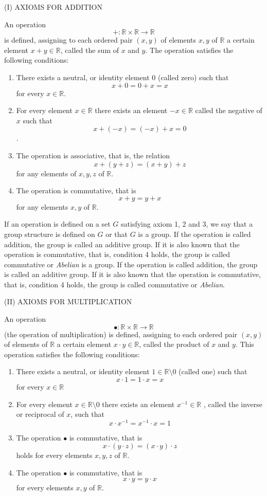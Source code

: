 \documentclass[a4paper,12pt]{article} %
\begin{document}
\begin{center}
    (I) AXIOMS FOR ADDITION
\end{center}
An operation 
\[+:\mathbb{R}\times\mathbb{R} \to \mathbb{R}\]
is defined, assigning to each ordered pair $(x,y)$ of elements 
$x,y$ of $\mathbb{R}$ a certain element $x+y\in\mathbb{R}$, called 
the sum of $x$ and $y$. The operation satisfies the following 
conditions:
\begin{enumerate}
    \item There exists a neutral, or identity element 0 
        (called zero) such that 
    \[x+0=0+x=x\]
    for every $x\in\mathbb{R}$.
    \item For every element $x\in \mathbb{R}$ there exists an element 
    $-x\in\mathbb{R}$ called the negative of $x$ such that
        \[x+(-x)=(-x)+x=0\].
    \item The operation is associative, that is, the relation
        \[x+(y+z) = (x+y)+z\] for any elements of $x,y,z$ of $\mathbb{R}$.
    \item The operation is commutative, that is 
        \[x+y=y+x\] for any elements $x,y$ of $\mathbb{R}$.
\end{enumerate}

If an operation is defined on a set $G$ satisfying axiom 1, 2 and 3, we
say that a group structure is defined on $G$ or that $G$ is a group. 
If the operation is called addition, the group is called an additive 
group. If it is also known that the operation is commutative, that is, 
condition 4 holds, the group is called commutative or \textit{Abelian} is a group. 
If the operation is called addition, the group is called an additive 
group. If it is also known that the operation is commutative, that is, 
condition 4 holds, the group is called commutative or \textit{Abelian}.

\begin{center}
    (II) AXIOMS FOR MULTIPLICATION
\end{center}
An operation \[\bullet:\mathbb{R}\times\mathbb{R}\to\mathbb{R}\]
(the operation of multiplication) is defined, assigning to 
each ordered pair $(x,y)$ of elements of $\mathbb{R}$ a certain
element $x\cdot y\in \mathbb{R}$, called the product of $x$ and 
$y$. This operation satisfies the following conditions:
\begin{enumerate}
    \item There exists a neutral, or identity element 
        $1\in \mathbb{R}\setminus 0$ (called one) such that 
        \[x\cdot 1 = 1\cdot x=x\] for every $x\in \mathbb{R}$
    \item For every element $x\in\mathbb{R}\setminus 0 $ 
        there exists an element $x^{-1}\in \mathbb{R}$ ,
        called the inverse or reciprocal of $x$, such that
        \[x\cdot x^{-1}=x^{-1}\cdot x=1\]
    \item The operation $\bullet$ is commutative, that is 
        \[x\cdot(y\cdot z) = (x\cdot y)\cdot z\] holds 
        for every elements $x,y,z$ of $\mathbb{R}$.
    \item The operation $\bullet$ is commutative, that is 
        \[ x\cdot y = y\cdot x\] for every elements $x,y$ of $\mathbb{R}$.
\end{enumerate}
\end{document}
